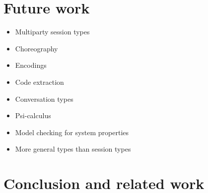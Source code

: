 \documentclass{article}
\begin{document}
\section{Future work}
\begin{itemize}
\item Multiparty session types
\item Choreography
\item Encodings
\item Code extraction
\item Conversation types
\item Psi-calculus
\item Model checking for system properties
\item More general types than session types
\end{itemize}

\section{Conclusion and related work}
\end{document}
